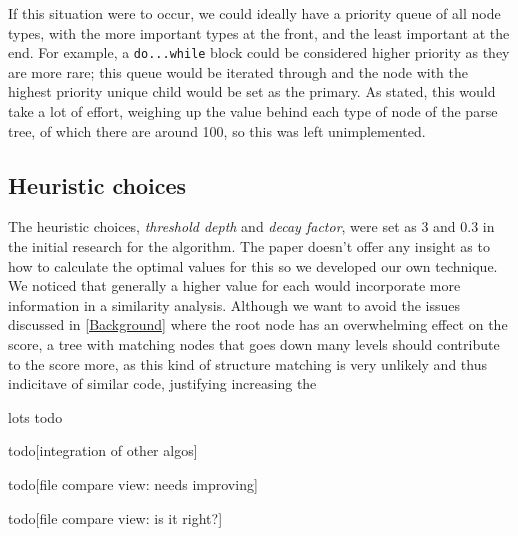If this situation were to occur, we could ideally have a priority queue of all
node types, with the more important types at the front, and the least important
at the end. For example, a \texttt{do...while} block could be considered higher
priority as they are more rare; this queue would be iterated through and the 
node with the highest priority unique child would be set as the primary. As stated,
this would take a lot of effort, weighing up the value behind each type of node
of the parse tree, of which there are around 100, so this was left unimplemented.



\subsection{Heuristic choices}
The heuristic choices, \emph{threshold depth} and \emph{decay factor}, were 
set as 3 and 0.3 in the initial research for the algorithm\cite{ParseTreeKernel}. 
The paper doesn't offer any insight as to how to calculate the optimal values
for this so we developed our own technique. We noticed that generally a higher value
for each would incorporate more information in a similarity analysis. Although we
want to avoid the issues discussed in \cref{Background} where the root node has
an overwhelming effect on the score, a tree with matching nodes that goes down
many levels should contribute to the score more, as this kind of structure matching
is very unlikely and thus indicitave of similar code, justifying increasing the



\newpage lots todo

todo[integration of other algos]

todo[file compare view: needs improving]

todo[file compare view: is it right?]